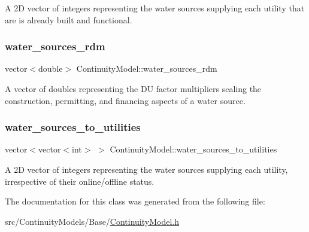 A 2D vector of integers representing the water sources supplying each utility that are is already built and functional. 

\mbox{\label{classContinuityModel_ab7b8fa93a6f56b328e425e1ead6cfefa}} 
\subsubsection{\texorpdfstring{water\+\_\+sources\+\_\+rdm}{water\_sources\_rdm}}
{\footnotesize\ttfamily vector$<$double$>$ Continuity\+Model\+::water\+\_\+sources\+\_\+rdm\hspace{0.3cm}{\ttfamily [protected]}}



A vector of doubles representing the DU factor multipliers scaling the construction, permitting, and financing aspects of a water source. 

\mbox{\label{classContinuityModel_ae8516bcbbf52650190277fc8b06c1843}} 
\subsubsection{\texorpdfstring{water\+\_\+sources\+\_\+to\+\_\+utilities}{water\_sources\_to\_utilities}}
{\footnotesize\ttfamily vector$<$vector$<$int$>$ $>$ Continuity\+Model\+::water\+\_\+sources\+\_\+to\+\_\+utilities\hspace{0.3cm}{\ttfamily [protected]}}



A 2D vector of integers representing the water sources supplying each utility, irrespective of their online/offline status. 



The documentation for this class was generated from the following file\+:\begin{DoxyCompactItemize}
\item 
src/\+Continuity\+Models/\+Base/\mbox{\hyperlink{ContinuityModel_8h}{Continuity\+Model.\+h}}\end{DoxyCompactItemize}

